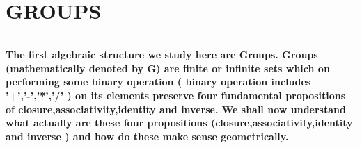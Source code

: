 \documentclass{article}
\begin{document}
\section * {GROUPS}
\hrule 
\bigskip
\textbf{ The first algebraic structure we study here are Groups. Groups (mathematically denoted by G) are finite or infinite sets which on performing some binary operation ( binary operation includes '+','-','*','/' ) on its elements preserve four fundamental propositions of closure,associativity,identity and inverse. We shall now understand what actually are these four propositions (closure,associativity,identity and inverse ) and how do these make sense geometrically.}
\\
\\
\\
\pagebreak

\pagebreak
\end{document}

